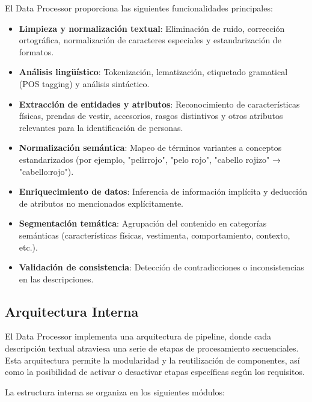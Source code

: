 \documentclass[12pt,a4paper]{article}
\begin{document}
El Data Processor proporciona las siguientes funcionalidades principales:

\begin{itemize}
    \item \textbf{Limpieza y normalización textual}: Eliminación de ruido, corrección ortográfica, normalización de caracteres especiales y estandarización de formatos.
    
    \item \textbf{Análisis lingüístico}: Tokenización, lematización, etiquetado gramatical (POS tagging) y análisis sintáctico.
    
    \item \textbf{Extracción de entidades y atributos}: Reconocimiento de características físicas, prendas de vestir, accesorios, rasgos distintivos y otros atributos relevantes para la identificación de personas.
    
    \item \textbf{Normalización semántica}: Mapeo de términos variantes a conceptos estandarizados (por ejemplo, "pelirrojo", "pelo rojo", "cabello rojizo" → "cabello:rojo").
    
    \item \textbf{Enriquecimiento de datos}: Inferencia de información implícita y deducción de atributos no mencionados explícitamente.
    
    \item \textbf{Segmentación temática}: Agrupación del contenido en categorías semánticas (características físicas, vestimenta, comportamiento, contexto, etc.).
    
    \item \textbf{Validación de consistencia}: Detección de contradicciones o inconsistencias en las descripciones.
\end{itemize}

\subsection{Arquitectura Interna}
\label{subsec:dp-arquitectura}

El Data Processor implementa una arquitectura de pipeline, donde cada descripción textual atraviesa una serie de etapas de procesamiento secuenciales. Esta arquitectura permite la modularidad y la reutilización de componentes, así como la posibilidad de activar o desactivar etapas específicas según los requisitos.

La estructura interna se organiza en los siguientes módulos:
\end{document}

